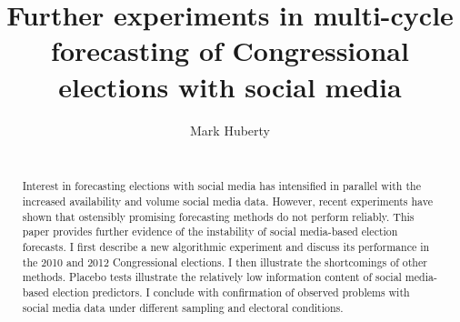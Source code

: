 \documentclass{acm_proc_article-sp}
\begin{document}
\title{Further experiments in multi-cycle forecasting of Congressional
  elections with social media}
\author{\alignauthor
Mark Huberty\\
\\
}

\maketitle
\begin{abstract}
  Interest in forecasting elections with social media has intensified
  in parallel with the increased availability and volume social media
  data. However, recent experiments have shown that ostensibly
  promising forecasting methods do not perform reliably. This paper
  provides further evidence of the instability of social media-based
  election forecasts. I first describe a new algorithmic experiment
  and discuss its performance in the 2010 and 2012 Congressional
  elections. I then illustrate the shortcomings of other
  methods. Placebo tests illustrate the relatively low information
  content of social media-based election predictors. I conclude with
  confirmation of observed problems with social media data under
  different sampling and electoral conditions. 
\end{abstract}
\end{document}
